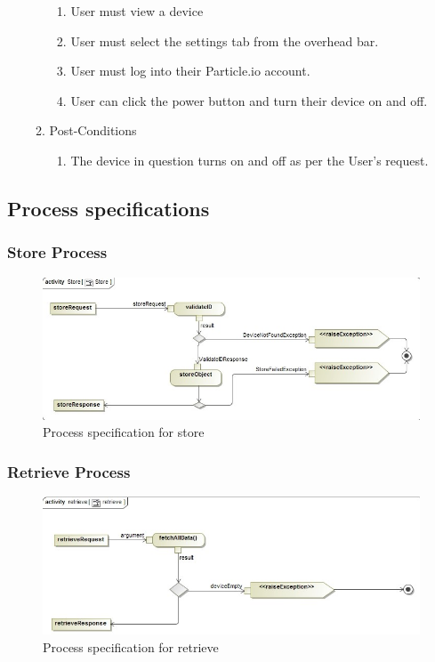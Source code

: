 \documentclass{article}
\begin{document}
\begin{enumerate}
\begin{enumerate}
\begin{enumerate}
				\item	User must view a device
				\item	User must select the settings tab from the overhead bar.
				\item	User must log into their Particle.io account.
				\item	User can click the power button and turn their device on and off.
			\end{enumerate}
			\item  Post-Conditions		
			\begin{enumerate}
				\item	The device in question turns on and off as per the User's request.
			\end{enumerate}
		\end{enumerate}
	\end{enumerate}
	\newpage
	\subsection{Process specifications}
	\subsubsection{Store Process}
	\begin{figure}[H]
		\includegraphics[width=\textwidth]{images/Store.jpg}
		\caption{Process specification for store \label{overflow}}
	\end{figure}
	\subsubsection{Retrieve Process}
	\begin{figure}[H]
		\includegraphics[width=\textwidth]{images/Retrieve.jpg}
		\caption{Process specification for retrieve \label{overflow}}
	\end{figure}
\end{document}
